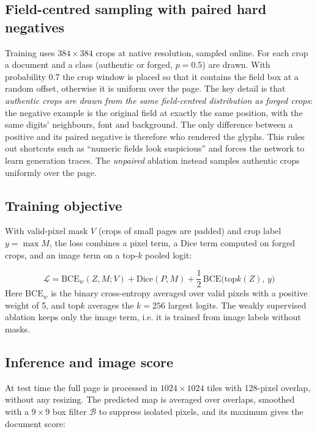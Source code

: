 \documentclass[conference]{IEEEtran}
\begin{document}
\subsection{Field-centred sampling with paired hard negatives}
Training uses $384\times384$ crops at native resolution, sampled online. For each crop a document and a class (authentic or forged, $p=0.5$) are drawn. With probability 0.7 the crop window is placed so that it contains the field box at a random offset, otherwise it is uniform over the page. The key detail is that \emph{authentic crops are drawn from the same field-centred distribution as forged crops}: the negative example is the original field at exactly the same position, with the same digits' neighbours, font and background. The only difference between a positive and its paired negative is therefore who rendered the glyphs. This rules out shortcuts such as ``numeric fields look suspicious'' \cite{geirhos} and forces the network to learn generation traces. The \emph{unpaired} ablation instead samples authentic crops uniformly over the page.

\subsection{Training objective}
With valid-pixel mask $V$ (crops of small pages are padded) and crop label $y=\max M$, the loss combines a pixel term, a Dice term \cite{vnet} computed on forged crops, and an image term on a top-$k$ pooled logit:

\begin{equation}
\mathcal{L} = \mathrm{BCE}_{w}(Z, M; V) + \mathrm{Dice}(P, M) + \frac{1}{2}\,\mathrm{BCE}\big(\mathrm{top}k(Z),\, y\big)
\label{eq:loss}
\end{equation}
Here $\mathrm{BCE}_w$ is the binary cross-entropy averaged over valid pixels with a positive weight of 5, and $\mathrm{top}k$ averages the $k=256$ largest logits. The weakly supervised ablation keeps only the image term, i.e. it is trained from image labels without masks.

\subsection{Inference and image score}
At test time the full page is processed in $1024\times1024$ tiles with 128-pixel overlap, without any resizing. The predicted map is averaged over overlaps, smoothed with a $9\times9$ box filter $\mathcal{B}$ to suppress isolated pixels, and its maximum gives the document score:
\end{document}
